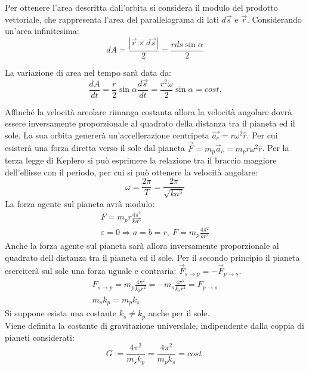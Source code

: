 \documentclass{article}
\numberwithin{equation}{subsection}
\begin{document}
Per ottenere l'area descritta dall'orbita si considera il modulo del prodotto vettoriale, che rappresenta l'area del parallelograma di lati $d\vec{s}$ e 
$\vec{r}$. Considerando un'area infinitesima:
\begin{equation*}
    dA=\displaystyle\frac{|\vec{r}\times d\vec{s}|}{2}=\frac{rds\sin\alpha}{2}
\end{equation*}

La variazione di area nel tempo sarà data da:
\begin{equation*}
    \displaystyle\frac{dA}{dt}=\frac{r}{2}\sin\alpha\frac{d\vec{s}}{dt}=\frac{r^2\omega}{2}\sin\alpha=cost.
\end{equation*}

Affinché la velocità areolare rimanga costanta allora la velocità angolare dovrà essere inversamente proporzionale al quadrato della distanza 
tra il pianeta ed il sole. La sua orbita genererà un'accellerazione centripeta $\vec{a_c}=r\omega^2\hat{r}$. Per cui esisterà una forza diretta verso 
il sole dal pianeta $\vec{F}=m_p\vec{a}_c=m_pr\omega^2\hat{r}$. Per la terza legge di Keplero si può esprimere la relazione tra il braccio maggiore
dell'ellisse con il periodo, per cui si può ottenere la velocità angolare: 
\begin{equation*}
    \omega=\displaystyle\frac{2\pi}{T}=\frac{2\pi}{\sqrt{ka^3}}
\end{equation*}
La forza agente sul pianeta avrà modulo:
\begin{gather*}
    F=m_pr\displaystyle\frac{4\pi^2}{ka^3}\\
    \varepsilon=0\Rightarrow a=b=r,\:F=m_p\displaystyle\frac{4\pi^2}{kr^2}
\end{gather*}
Anche la forza agente sul pianeta sarà allora inversamente proporzionale al quadrato dell distanza tra il pianeta ed il sole. Per il secondo 
principio il pianeta eserciterà sul sole una forza uguale e contraria: $\vec{F}_{s\to p}=-\vec{F}_{p\to s}$. 
\begin{gather*}
    F_{s\to p}=m_p\displaystyle\frac{4\pi^2}{k_pr^2}=-m_s\displaystyle\frac{4\pi^2}{k_sr^2}=F_{p\to s}\\
    m_sk_p=m_pk_s
\end{gather*}
Si suppone esista una costante $k_s\neq k_p$ anche per il sole. \\
Viene definita la costante di gravitazione universlale, indipendente dalla coppia di pianeti considerati:
\begin{equation}
    G:=\displaystyle\frac{4\pi^2}{m_sk_p}=\frac{4\pi^2}{m_pk_s}=cost.
\end{equation}
\end{document}
